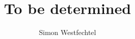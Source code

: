 \documentclass[10pt,a4paper]{book}
\author{Simon Westfechtel}
\begin{document}
	
	\title{To be determined}
	\maketitle
	
	
	
	
	
	
	
	
\end{document}
